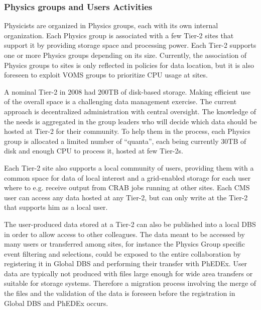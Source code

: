 \subsubsection{Physics groups and Users Activities}
\label{sec:4_3_2}
Physicists are organized in Physics groups, each with its own internal 
organization.
Each Physics group is associated with a few Tier-2 sites that support it by 
providing storage space and processing power.
Each Tier-2 supports one or more Physics groups depending on its size.
Currently, the association of Physics groups to sites is only reflected in policies for data location, but it is also foreseen to exploit VOMS groups to prioritize CPU usage at sites.

A nominal Tier-2 in 2008 had 200TB of disk-based storage.
Making efficient use of the overall space is a challenging data management exercise.
The current approach is decentralized administration with central oversight.
The knowledge of the needs is aggregated in the group leaders who will decide which data should be hosted at Tier-2 for their community. To help
them in the process, each Physics group is allocated a limited number 
of ``quanta'', each being currently 30TB of disk and enough CPU to process it, hosted at few Tier-2s. 

Each Tier-2 site also supports a local community of users, providing them
with a common space for data of local interest and a grid-enabled
storage for each user where to e.g. receive output from CRAB jobs
running at other sites. Each CMS user can access any data
hosted at any Tier-2, but can only write at the Tier-2 that supports him
as a local user.

The user-produced data stored at a Tier-2 can also be published into a local DBS
in order to allow access to other colleagues.
The data meant to be accessed by many users or transferred among sites, for instance the Physics Group specific event filtering and selections,
could be exposed to the entire collaboration by registering it in Global DBS and performing their transfer with PhEDEx.
User data are typically not produced with files large enough for wide area transfers or suitable for storage systems. Therefore a migration process involving the merge of the files and the validation of the data is foreseen before the registration in Global DBS and PhEDEx occurs.
 
